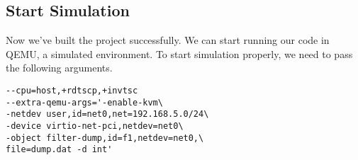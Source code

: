 \subsection{Start Simulation}
Now we've built the project successfully. 
We can start running our code in QEMU, a simulated environment. 
To start simulation properly, we need to pass the following arguments.

\begin{lstlisting}
--cpu=host,+rdtscp,+invtsc
--extra-qemu-args='-enable-kvm\
-netdev user,id=net0,net=192.168.5.0/24\
-device virtio-net-pci,netdev=net0\
-object filter-dump,id=f1,netdev=net0,\
file=dump.dat -d int'
\end{lstlisting}